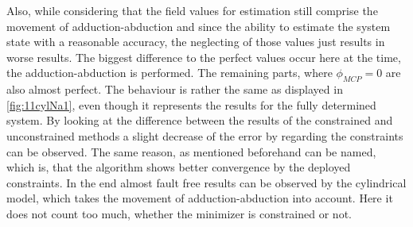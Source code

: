 Also, while considering that the field values for estimation still comprise the movement of adduction-abduction and since the ability to estimate the system state with a reasonable accuracy, the neglecting of those values just results in worse results. The biggest difference to the perfect values occur here at the time, the adduction-abduction is performed. The remaining parts, where $ \phi_{MCP} = 0 $ are also almost perfect. The behaviour is rather the same as displayed in \ref{fig:11cylNa1}, even though it represents the results for the fully determined system. By looking at the difference between the results of the constrained and unconstrained methods a slight decrease of the error by regarding the constraints can be observed. The same reason, as mentioned beforehand can be named, which is, that the algorithm shows better convergence by the deployed constraints. In the end almost fault free results can be observed by the cylindrical model, which takes the movement of adduction-abduction into account. Here it does not count too much, whether the minimizer is constrained or not. \\
